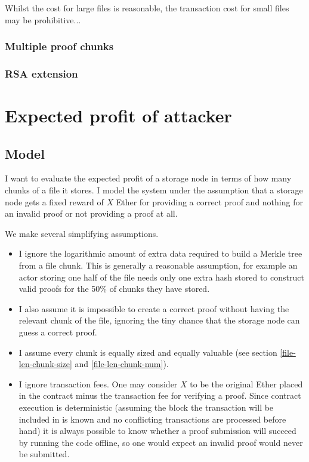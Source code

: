\documentclass[12pt,a4paper,twoside,openright]{report}
\begin{document}
Whilst the cost for large files is reasonable, the transaction cost for small files may be prohibitive...

\subsubsection{Multiple proof chunks}

\subsubsection{RSA extension}


\section{Expected profit of attacker}


\subsection{Model}

I want to evaluate the expected profit of a storage node in terms of how many chunks of a file it stores.
I model the system under the assumption that a storage node gets a fixed reward of $X$ Ether for providing a correct proof and nothing for an invalid proof
or not providing a proof at all.

We make several simplifying assumptions.
\begin{itemize}
\item I ignore the logarithmic amount of extra data required to build a Merkle tree from a file chunk.
This is generally a reasonable assumption, for example an actor storing one half of the file needs only one extra hash stored to
construct valid proofs for the 50\% of chunks they have stored.

\item I also assume it is impossible to create a correct proof without having the relevant chunk of the file,
ignoring the tiny chance that the storage node can guess a correct proof.

\item I assume every chunk is equally sized and equally valuable (see section \ref{file-len-chunk-size} and \ref{file-len-chunk-num}).

\item I ignore transaction fees. One may consider $X$ to be the original Ether placed in the contract minus the transaction fee for verifying a proof.
Since contract execution is deterministic (assuming the block the transaction will be included in is known and no conflicting transactions are processed before hand) it is 
always possible to know whether a proof submission will succeed by running the code offline, so one would expect an invalid proof would never be submitted.
\end{itemize}
\end{document}
